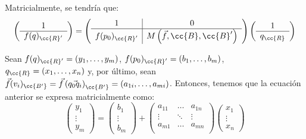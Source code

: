 Matricialmente, se tendría que:
\begin{equation*}
    \left(\begin{array}{c}
        1 \\ \hline
        f(q)_{\cc{R}'} 
    \end{array}\right)
    = \left(\begin{array}{c|c}
        1 & 0 \\ \hline
        f(p_0)_{\cc{R}'} &  M\left(\vec{f},\cc{B},\cc{B}'\right)  \\
    \end{array}\right)
    \left(\begin{array}{c}
        1\\ \hline
        q_{\cc{R}}
    \end{array}\right)
\end{equation*}

Sean $f(q)_{\cc{R}'}=(y_1,\dots,y_m)$, $f(p_0)_{\cc{R}'}=(b_1,\dots,b_m)$, $q_{\cc{R}}=(x_1,\dots,x_n)$ y, por último, sean $\vec{f}(v_i)_{\cc{B'}}=\vec{f}\left(\vec{q_0q_i}\right)_{\cc{B'}}=(a_{1i}, \dots, a_{mi})$. Entonces, tenemos que la ecuación anterior se expresa matricialmente como:
\begin{equation*}
    \left(\begin{array}{c}
        y_1\\ \vdots \\ y_m
    \end{array}\right)
    = 
    \left(\begin{array}{c}
        b_1\\ \vdots \\ b_m
    \end{array}\right)
    +
    \left(\begin{array}{ccc}
        a_{11} & \dots & a_{1n}\\
        \vdots & \ddots & \vdots \\
        a_{m1} & \dots & a_{mn}\\
    \end{array}\right)
    \left(\begin{array}{c}
        x_1\\ \vdots \\ x_n
    \end{array}\right)
\end{equation*}

